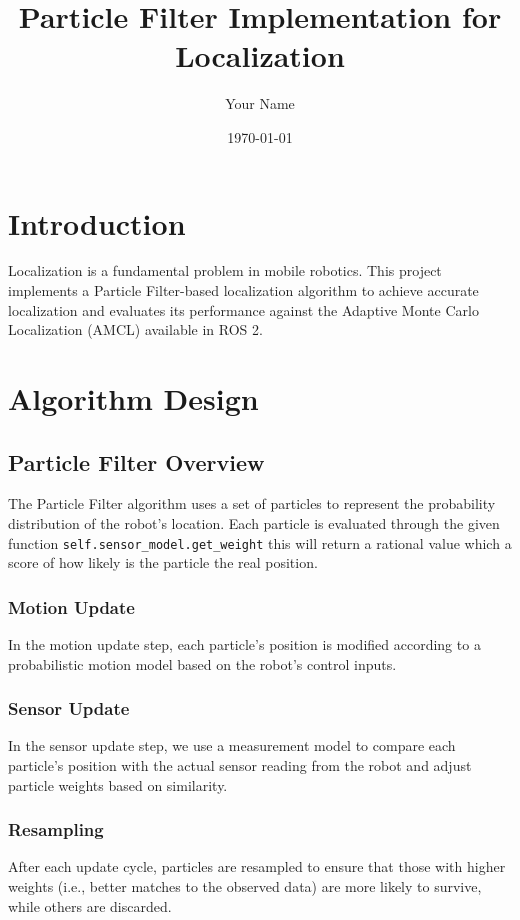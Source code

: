 \documentclass[11pt]{article}
\title{Particle Filter Implementation for Localization}
\author{Your Name}
\date{\today}
\begin{document}
\maketitle


\section{Introduction}
Localization is a fundamental problem in mobile robotics. This project implements a Particle Filter-based localization algorithm to achieve accurate localization and evaluates its performance against the Adaptive Monte Carlo Localization (AMCL) available in ROS 2.

\section{Algorithm Design}

\subsection{Particle Filter Overview}
The Particle Filter algorithm uses a set of particles to represent the probability distribution of the robot's location. Each particle is evaluated through the given function \texttt{self.sensor\_model.get\_weight} this will return a rational value which a score of how likely is the particle the real position. 

\subsubsection{Motion Update}
In the motion update step, each particle’s position is modified according to a probabilistic motion model based on the robot’s control inputs.

\subsubsection{Sensor Update}
In the sensor update step, we use a measurement model to compare each particle’s position with the actual sensor reading from the robot and adjust particle weights based on similarity.

\subsubsection{Resampling}
After each update cycle, particles are resampled to ensure that those with higher weights (i.e., better matches to the observed data) are more likely to survive, while others are discarded.
\end{document}
